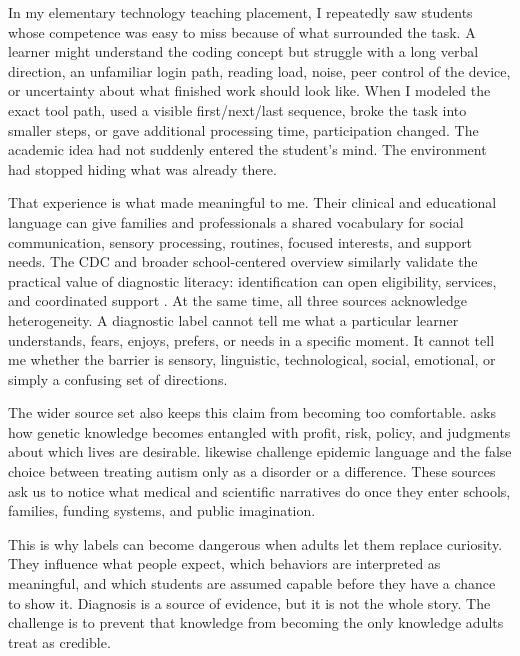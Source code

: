 
In my elementary technology teaching placement, I repeatedly saw students whose competence was easy to miss because of what surrounded the task. A learner might understand the coding concept but struggle with a long verbal direction, an unfamiliar login path, reading load, noise, peer control of the device, or uncertainty about what finished work should look like. When I modeled the exact tool path, used a visible first/next/last sequence, broke the task into smaller steps, or gave additional processing time, participation changed. The academic idea had not suddenly entered the student's mind. The environment had stopped hiding what was already there.

That experience is what made \citet{cole2023autism} meaningful to me. Their clinical and educational language can give families and professionals a shared vocabulary for social communication, sensory processing, routines, focused interests, and support needs. The CDC and broader school-centered overview similarly validate the practical value of diagnostic literacy: identification can open eligibility, services, and coordinated support \citep{cdcASD,simon2016asd}. At the same time, all three sources acknowledge heterogeneity. A diagnostic label cannot tell me what a particular learner understands, fears, enjoys, prefers, or needs in a specific moment. It cannot tell me whether the barrier is sensory, linguistic, technological, social, emotional, or simply a confusing set of directions.

The wider source set also keeps this claim from becoming too comfortable. \citet{nadesan2013genetics} asks how genetic knowledge becomes entangled with profit, risk, policy, and judgments about which lives are desirable. \citet{orsiniDavidson2013critical} likewise challenge epidemic language and the false choice between treating autism only as a disorder or a difference. These sources ask us to notice what medical and scientific narratives do once they enter schools, families, funding systems, and public imagination.

This is why labels can become dangerous when adults let them replace curiosity. They influence what people expect, which behaviors are interpreted as meaningful, and which students are assumed capable before they have a chance to show it. Diagnosis is a source of evidence, but it is not the whole story. The challenge is to prevent that knowledge from becoming the only knowledge adults treat as credible.

